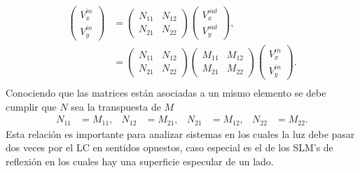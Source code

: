 \begin{enumerate}
 \begin{align*}
    \begin{pmatrix}
      V_x^{in}\\V_y^{in}
    \end{pmatrix}
    &=
    \begin{pmatrix}
      N_{11}&N_{12}\\N_{21} & N_{22}
    \end{pmatrix}
    \begin{pmatrix}
      V_x^{out}\\V_y^{out}
    \end{pmatrix},\\
    &=
    \begin{pmatrix}
      N_{11}&N_{12}\\N_{21} & N_{22}
    \end{pmatrix}
    \begin{pmatrix}
      M_{11}&M_{12}\\M_{21} & M_{22}
    \end{pmatrix}
    \begin{pmatrix}
      V_x^{in}\\V_y^{in}
    \end{pmatrix}.\\
  \end{align*}
  Conociendo que las matrices están asociadas a un mismo elemento se
  debe cumplir que $N$ sea la transpuesta de $M$
  \begin{align*}
    N_{11}&=M_{11},&    N_{12}&=M_{21},&     N_{21}&=M_{12}, &     N_{22}&=M_{22}.
  \end{align*}
Esta relación es importante para analizar sistemas en los cuales la
luz debe pasar dos veces por el LC en sentidos opuestos, caso especial
es el de los SLM's de reflexión en los cuales hay una
superficie especular de un lado.


\end{enumerate}
